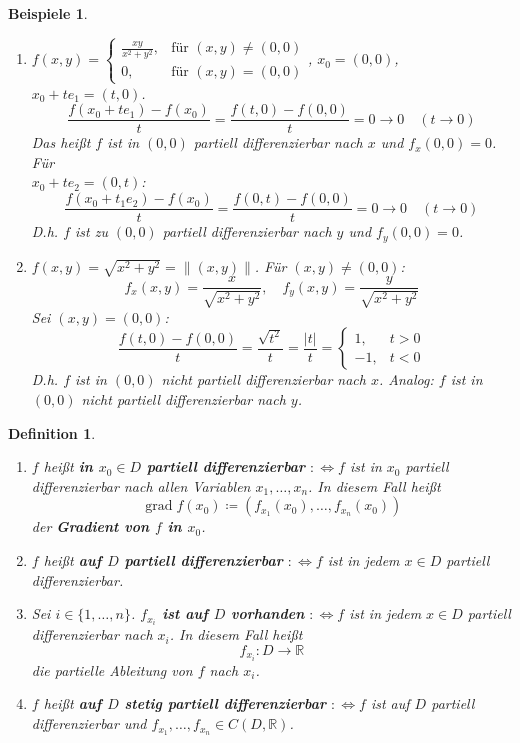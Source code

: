 \documentclass[12pt]{extreport} %
\newcommand{\R}{\mathbb{R}}
\theoremstyle{named}
\theoremstyle{nnamed}
\theoremstyle{itshape}
\newtheorem*{definition}{Definition}
\theoremstyle{normal}
\newtheorem*{beispiele}{Beispiele}
\begin{document}
\begin{beispiele} ~\
	\begin{enumerate}
		\item $f(x,y) = \begin{cases} \frac{xy}{x^{2}+y^{2}}, & \text{für } (x, y) \neq (0,0) \\ 0, & \text{für } (x, y) = (0, 0) \end{cases}$, $x_{0} = (0,0)$, $x_{0} + te_{1} = (t, 0)$.
			$$ \frac{f(x_{0} + te_{1}) - f(x_{0})}{t} = \frac{f(t, 0) - f(0,0)}{t} = 0 \rightarrow 0 \quad (t \rightarrow 0) $$
			Das hei{\ss}t $f$ ist in $(0,0)$ partiell differenzierbar nach $x$ und $f_{x}(0,0) = 0$. Für ~\\
			$x_{0} + te_{2} = (0, t)$:
			$$ \frac{f(x_{0} + t_{1}e_{2}) - f(x_{0})}{t} = \frac{f(0, t) - f(0, 0)}{t} = 0 \longrightarrow 0 \quad (t \rightarrow 0) $$
			D.h. $f$ ist zu $(0,0)$ partiell differenzierbar nach $y$ und $f_{y}(0, 0) = 0$.
		\item $f(x, y) = \sqrt{x^{2} + y^{2}} = \|(x, y) \|$. Für $(x, y) \neq (0, 0)$:
			$$ f_{x}(x, y) = \frac{x}{\sqrt{x^{2} + y^{2}}}, \quad f_{y}(x,y) = \frac{y}{\sqrt{x^{2} + y^{2}}} $$
			Sei $(x, y) = (0, 0)$:
			$$ \frac{f(t,0) - f(0,0)}{t} = \frac{\sqrt{t^{2}}}{t} = \frac{|t|}{t} = \begin{cases}1, & t > 0 \\ -1, & t < 0 \end{cases} $$
			D.h. $f$ ist in $(0,0)$ nicht partiell differenzierbar nach $x$. Analog: $f$ ist in $(0,0)$ nicht partiell differenzierbar nach $y$.
	\end{enumerate}
\end{beispiele}

 
\begin{definition} ~\
	\begin{enumerate}
		\item $f$ hei{\ss}t \textbf{in $x_{0} \in D$ partiell differenzierbar} $:\iff f$ ist in $x_{0}$ partiell differenzierbar nach allen Variablen $x_{1}, \dotsc, x_{n}$. In diesem Fall hei{\ss}t
			$$ \operatorname{grad} f(x_{0}) \coloneqq \left( f_{x_{1}}(x_{0}), \dotsc, f_{x_{n}}(x_{0})\right) $$
			der \textbf{Gradient von $f$ in $x_{0}$}.
		\item $f$ hei{\ss}t \textbf{auf $D$ partiell differenzierbar} $:\iff f$ ist in jedem $x \in D$ partiell differenzierbar.
		\item Sei $i \in \{1, \dotsc, n\}$. \textbf{$f_{x_{i}}$ ist auf $D$ vorhanden} $:\iff f$ ist in jedem $x \in D$ partiell differenzierbar nach $x_{i}$. In diesem Fall hei{\ss}t 
			$$ f_{x_{i}} \colon D \rightarrow \R $$
			die partielle Ableitung von $f$ nach $x_{i}$.
		\item $f$ hei{\ss}t \textbf{auf $D$ stetig partiell differenzierbar} $:\iff f$ ist auf $D$ partiell differenzierbar und $f_{x_{1}}, \dotsc, f_{x_{n}} \in C\left(D, \R\right)$.
	\end{enumerate}
\end{definition}
\end{document}
